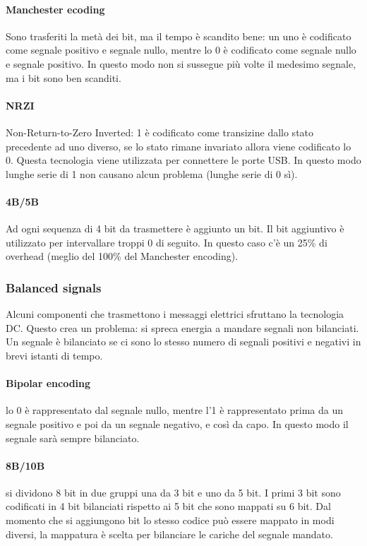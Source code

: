 \documentclass{article}
\begin{document}
\paragraph{Manchester ecoding} Sono trasferiti la metà dei bit, ma il tempo è
scandito bene: un uno è codificato come segnale positivo e segnale nullo, mentre
lo 0 è codificato come segnale nullo e segnale positivo. In questo modo non si
sussegue più volte il medesimo segnale, ma i bit sono ben scanditi.

\paragraph{NRZI} Non-Return-to-Zero Inverted: 1 è codificato come transizine
dallo stato precedente ad uno diverso, se lo stato rimane invariato allora viene
codificato lo 0. Questa tecnologia viene utilizzata per connettere le porte USB.
In questo modo lunghe serie di 1 non causano alcun problema (lunghe serie di 0
sì).

\paragraph{4B/5B} Ad ogni sequenza di 4 bit da trasmettere è aggiunto un bit. Il
bit aggiuntivo è utilizzato per intervallare troppi 0 di seguito. In questo caso
c'è un 25\% di overhead (meglio del 100\% del Manchester encoding).

\subsubsection{Balanced signals}
Alcuni componenti che trasmettono i messaggi elettrici sfruttano la tecnologia
DC. Questo crea un problema: si spreca energia a mandare segnali non bilanciati.
Un segnale è bilanciato se ci sono lo stesso numero di segnali positivi e
negativi in brevi istanti di tempo.

\paragraph{Bipolar encoding} lo 0 è rappresentato dal segnale nullo, mentre l'1
è rappresentato prima da un segnale positivo e poi da un segnale negativo, e
così da capo. In questo modo il segnale sarà sempre bilanciato.

\paragraph{8B/10B} si dividono 8 bit in due gruppi una da 3 bit e uno da 5 bit.
I primi 3 bit sono codificati in 4 bit bilanciati rispetto ai 5 bit che sono
mappati su 6 bit. Dal momento che si aggiungono bit lo stesso codice può essere
mappato in modi diversi, la mappatura è scelta per bilanciare le cariche del
segnale mandato.
\end{document}
